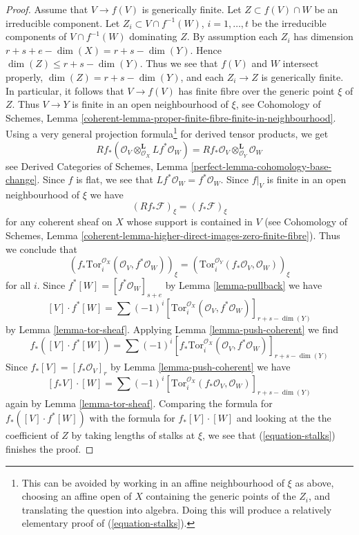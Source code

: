 \begin{proof}
\medskip\noindent
Assume that $V \to f(V)$ is generically finite. Let $Z \subset f(V) \cap W$
be an irreducible component. Let $Z_i \subset V \cap f^{-1}(W)$,
$i = 1, \ldots, t$ be the irreducible components of $V \cap f^{-1}(W)$
dominating $Z$. By assumption each $Z_i$ has dimension
$r + s + e - \dim(X) = r + s - \dim(Y)$. Hence
$\dim(Z) \leq r + s - \dim(Y)$. Thus we see that $f(V)$ and $W$
intersect properly, $\dim(Z) = r + s - \dim(Y)$, and each
$Z_i \to Z$ is generically finite. In particular, it follows that
$V \to f(V)$ has finite fibre over the generic point $\xi$ of $Z$.
Thus $V \to Y$ is finite in an open neighbourhood of $\xi$, see
Cohomology of Schemes, Lemma
\ref{coherent-lemma-proper-finite-fibre-finite-in-neighbourhood}.
Using a very general projection formula\footnote{This can be avoided
by working in an affine neighbourhood of $\xi$ as above, choosing
an affine open of $X$ containing the generic points of the $Z_i$, and
translating the question into algebra. Doing this will produce a
relatively elementary proof of (\ref{equation-stalks}).}
for derived tensor products, we get
$$
Rf_*(\mathcal{O}_V \otimes_{\mathcal{O}_X}^\mathbf{L} Lf^*\mathcal{O}_W) =
Rf_*\mathcal{O}_V \otimes_{\mathcal{O}_Y}^\mathbf{L} \mathcal{O}_W
$$
see Derived Categories of Schemes, Lemma
\ref{perfect-lemma-cohomology-base-change}.
Since $f$ is flat, we see that $Lf^*\mathcal{O}_W = f^*\mathcal{O}_W$.
Since $f|_V$ is finite in an open neighbourhood of $\xi$ we have
$$
(Rf_*\mathcal{F})_\xi = (f_*\mathcal{F})_\xi
$$
for any coherent sheaf on $X$ whose support is contained in $V$
(see Cohomology of Schemes, Lemma
\ref{coherent-lemma-higher-direct-images-zero-finite-fibre}). Thus
we conclude that
\begin{equation}
\label{equation-stalks}
\left(
f_*\text{Tor}_i^{\mathcal{O}_X}(\mathcal{O}_V, f^*\mathcal{O}_W)
\right)_\xi =
\left(\text{Tor}_i^{\mathcal{O}_Y}(f_*\mathcal{O}_V, \mathcal{O}_W)\right)_\xi
\end{equation}
for all $i$. Since $f^*[W] = [f^*\mathcal{O}_W]_{s + e}$ by
Lemma \ref{lemma-pullback} we have
$$
[V] \cdot f^*[W] =
\sum (-1)^i
[\text{Tor}_i^{\mathcal{O}_X}(\mathcal{O}_V,
f^*\mathcal{O}_W)]_{r + s - \dim(Y)}
$$
by Lemma \ref{lemma-tor-sheaf}. Applying
Lemma \ref{lemma-push-coherent}
we find
$$
f_*([V] \cdot f^*[W]) =
\sum (-1)^i
[f_*\text{Tor}_i^{\mathcal{O}_X}(\mathcal{O}_V,
f^*\mathcal{O}_W)]_{r + s - \dim(Y)}
$$
Since $f_*[V] = [f_*\mathcal{O}_V]_r$ by
Lemma \ref{lemma-push-coherent} we have
$$
[f_*V] \cdot [W] =
\sum (-1)^i
[\text{Tor}_i^{\mathcal{O}_X}(f_*\mathcal{O}_V,
\mathcal{O}_W)]_{r + s - \dim(Y)}
$$
again by Lemma \ref{lemma-tor-sheaf}.
Comparing the formula for $f_*([V] \cdot f^*[W])$ with
the formula for $f_*[V] \cdot [W]$ and looking at the
the coefficient of $Z$ by taking lengths of stalks at $\xi$, we see that
(\ref{equation-stalks}) finishes the proof.
\end{proof}

